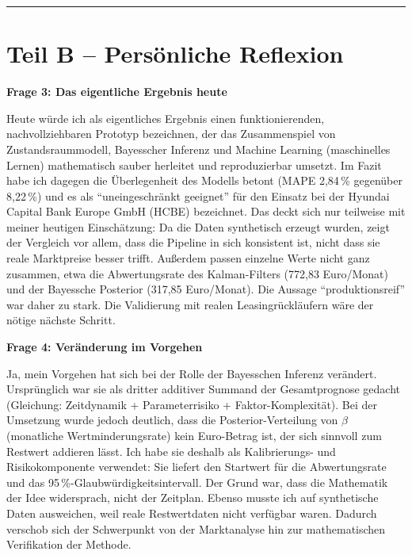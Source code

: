 \documentclass[a4paper,9pt]{article}
\begin{document}
\vspace{1mm}
\noindent\rule{\textwidth}{0.3pt}

\section*{Teil B -- Persönliche Reflexion}

\textbf{Frage 3: Das eigentliche Ergebnis heute}

Heute würde ich als eigentliches Ergebnis einen funktionierenden, nachvollziehbaren Prototyp bezeichnen, der das Zusammenspiel von Zustandsraummodell, Bayesscher Inferenz und Machine Learning (maschinelles Lernen) mathematisch sauber herleitet und reproduzierbar umsetzt. Im Fazit habe ich dagegen die Überlegenheit des Modells betont (MAPE 2,84\,\% gegenüber 8,22\,\%) und es als \enquote{uneingeschränkt geeignet} für den Einsatz bei der Hyundai Capital Bank Europe GmbH (HCBE) bezeichnet. Das deckt sich nur teilweise mit meiner heutigen Einschätzung: Da die Daten synthetisch erzeugt wurden, zeigt der Vergleich vor allem, dass die Pipeline in sich konsistent ist, nicht dass sie reale Marktpreise besser trifft. Außerdem passen einzelne Werte nicht ganz zusammen, etwa die Abwertungsrate des Kalman-Filters (772,83 Euro/Monat) und der Bayessche Posterior (317,85 Euro/Monat). Die Aussage \enquote{produktionsreif} war daher zu stark. Die Validierung mit realen Leasingrückläufern wäre der nötige nächste Schritt.

\textbf{Frage 4: Veränderung im Vorgehen}

Ja, mein Vorgehen hat sich bei der Rolle der Bayesschen Inferenz verändert. Ursprünglich war sie als dritter additiver Summand der Gesamtprognose gedacht (Gleichung: Zeitdynamik + Parameterrisiko + Faktor-Komplexität). Bei der Umsetzung wurde jedoch deutlich, dass die Posterior-Verteilung von $\beta$ (monatliche Wertminderungsrate) kein Euro-Betrag ist, der sich sinnvoll zum Restwert addieren lässt. Ich habe sie deshalb als Kalibrierungs- und Risikokomponente verwendet: Sie liefert den Startwert für die Abwertungsrate und das 95\,\%-Glaubwürdigkeitsintervall. Der Grund war, dass die Mathematik der Idee widersprach, nicht der Zeitplan. Ebenso musste ich auf synthetische Daten ausweichen, weil reale Restwertdaten nicht verfügbar waren. Dadurch verschob sich der Schwerpunkt von der Marktanalyse hin zur mathematischen Verifikation der Methode.
\end{document}
